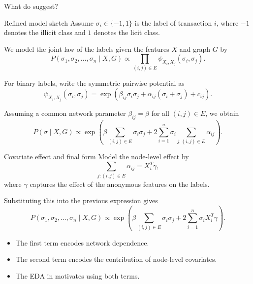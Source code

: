 \documentclass[aspectratio=169]{beamer}
\begin{document}
\begin{frame}{What do  suggest?}
\begin{frame}{Refined model sketch}
\small
Assume $\sigma_i \in \{-1,1\}$ is the label of transaction $i$, where $-1$ denotes the illicit class and $1$ denotes the licit class.

\vspace{0.15cm}
We model the joint law of the labels given the features $X$ and graph $G$ by
\[
    P(\sigma_1,\sigma_2,\ldots,\sigma_n \mid X,G)
    \propto \prod_{(i,j)\in E} \psi_{X_i,X_j}(\sigma_i,\sigma_j).
\]

For binary labels, write the symmetric pairwise potential as
\[
    \psi_{X_i,X_j}(\sigma_i,\sigma_j)
    = \exp\!\left(\beta_{ij}\sigma_i\sigma_j + \alpha_{ij}(\sigma_i+\sigma_j) + c_{ij}\right).
\]

Assuming a common network parameter $\beta_{ij}=\beta$ for all $(i,j)\in E$, we obtain
\[
P(\sigma \mid X,G)
\propto
\exp\!\left(
\beta \sum_{(i,j)\in E} \sigma_i\sigma_j
+ 2\sum_{i=1}^n \sigma_i \sum_{j:(i,j)\in E} \alpha_{ij}
\right).
\]
\end{frame}

\begin{frame}{Covariate effect and final form}
\small
Model the node-level effect by
\[
    \sum_{j:(i,j)\in E} \alpha_{ij} = X_i^T\gamma,
\]
where $\gamma$ captures the effect of the anonymous features on the labels.

\vspace{0.2cm}
Substituting this into the previous expression gives
\[
    P(\sigma_1,\sigma_2,\ldots,\sigma_n \mid X,G)
    \propto
    \exp\!\left(
        \beta \sum_{(i,j)\in E} \sigma_i\sigma_j
        + 2\sum_{i=1}^n \sigma_i X_i^T\gamma
    \right).
\]

\begin{itemize}
    \item The first term encodes \alert{network dependence}.
    \item The second term encodes the contribution of \alert{node-level covariates}.
    \item The EDA in  motivates using both terms.
\end{itemize}
\end{frame}


\end{frame}
\end{document}
